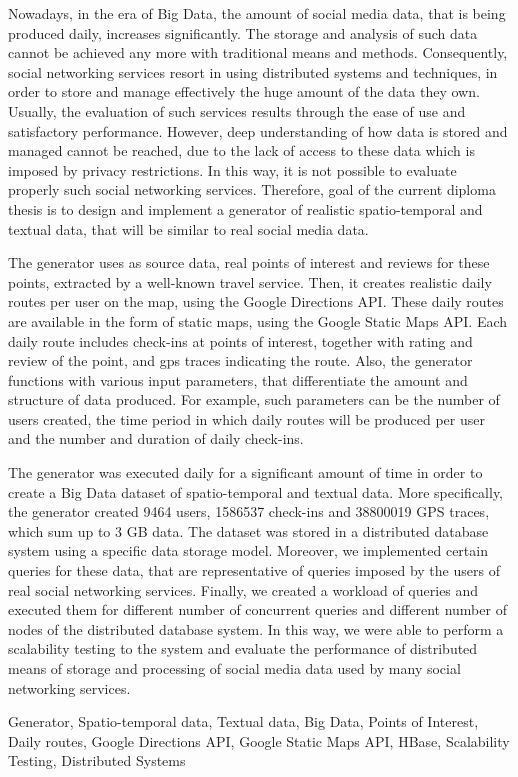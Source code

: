 
\begin{abstracten}%

Nowadays, in the era of Big Data, the amount of social media data, that is being produced daily, increases significantly. The storage and analysis of such data cannot 
be achieved any more with traditional means and methods. Consequently, social networking services resort in using distributed systems and techniques, in order to store 
and manage effectively the huge amount of the data they own. Usually, the evaluation of such services results through the ease of use and satisfactory performance. 
However, deep understanding of how data is stored and managed cannot be reached, due to the lack of access to these data which is imposed by 
privacy restrictions. In this way, it is not possible to 
evaluate properly such social networking services. Therefore, goal of the current diploma thesis is to design and implement a generator of realistic spatio-temporal and 
textual data, that will be similar to real social media data. 

The generator uses as source data, real points of interest and reviews for these points, extracted by a well-known travel service. Then, it creates 
realistic daily routes per user on the map, using the Google Directions API. These daily routes are available in the form of static maps, using the 
Google Static Maps API. Each daily route includes check-ins at points of interest, together with rating and review of the point, and gps traces 
indicating the route. Also, the generator functions with various input parameters, that differentiate the amount and structure of data produced. For example, such parameters 
can be the number of users created, the time period in which daily routes will be produced per user and the number and duration of daily check-ins. 

The generator was executed daily for a significant amount of time in order to create a Big Data dataset of spatio-temporal and textual data. 
More specifically, the generator created 9464 users, 1586537 check-ins and 38800019 GPS traces, which sum up to 3 GB data.
The dataset was stored in a distributed database system using a specific data storage model. Moreover, we implemented certain queries for these data, that are 
representative of queries imposed by the users of real social networking services. Finally, we created a workload of queries and executed them for 
different number of concurrent queries and different number of nodes of the distributed database system. In this way, we were able to perform a scalability 
testing to the system and evaluate the performance of distributed means of storage and processing of social media data used by many social networking services.

 \begin{keywordsen}
  Generator, Spatio-temporal data, Textual data, Big Data, Points of Interest, Daily routes, Google Directions API, Google Static Maps API, HBase, 
  Scalability Testing, Distributed Systems
 \end{keywordsen}
\end{abstracten}
